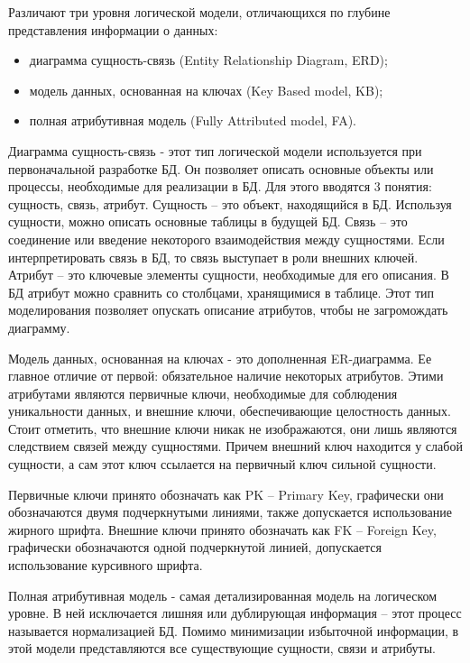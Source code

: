 Различают три уровня логической модели, отличающихся по глубине представления информации о данных:

\begin{itemize}
    \item диаграмма сущность-связь (Entity Relationship Diagram, ERD);
    \item модель данных, основанная на ключах (Key Based model, KB);
    \item полная атрибутивная модель (Fully Attributed model, FA).
\end{itemize}

Диаграмма сущность-связь - этот тип логической модели используется при первоначальной разработке БД. Он позволяет описать основные объекты или процессы, необходимые для реализации в БД. Для этого вводятся 3 понятия: сущность, связь, атрибут. Сущность – это объект, находящийся в БД. Используя сущности, можно описать основные таблицы в будущей БД. Связь – это соединение или введение некоторого взаимодействия между сущностями. Если интерпретировать связь в БД, то связь выступает в роли внешних ключей. Атрибут – это ключевые элементы сущности, необходимые для его описания. В БД атрибут можно сравнить со столбцами, хранящимися в таблице. Этот тип моделирования позволяет опускать описание атрибутов, чтобы не загромождать диаграмму.

Модель данных, основанная на ключах - это дополненная ER-диаграмма. Ее главное отличие от первой: обязательное наличие некоторых атрибутов. Этими атрибутами являются первичные ключи, необходимые для соблюдения уникальности данных, и внешние ключи, обеспечивающие целостность данных. Стоит отметить, что внешние ключи никак не изображаются, они лишь являются следствием связей между сущностями. Причем внешний ключ находится у слабой сущности, а сам этот ключ ссылается на первичный ключ сильной сущности.

Первичные ключи принято обозначать как PK – Primary Key, графически они обозначаются двумя подчеркнутыми линиями, также допускается использование жирного шрифта. Внешние ключи принято обозначать как FK – Foreign Key, графически обозначаются одной подчеркнутой линией, допускается использование курсивного шрифта.

Полная атрибутивная модель - самая детализированная модель на логическом уровне. В ней исключается лишняя или дублирующая информация – этот процесс называется нормализацией БД. Помимо минимизации избыточной информации, в этой модели представляются все существующие сущности, связи и атрибуты.

